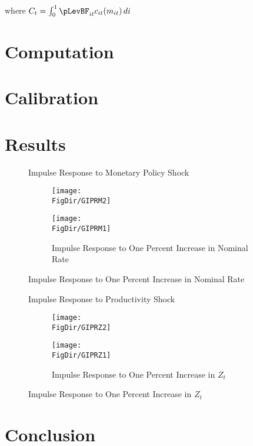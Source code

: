 \documentclass[titlepage]{\econtex}\providecommand{\texname}{BufferStockTheory}
\providecommand{\FigDir}{Figures}
\providecommand{\TableDir}{Tables}
\begin{document}
 where $C_{t} =  \int_{0}^{1} \pLevBF_{it} c_{it}(m_{it})\, di $


\hypertarget{Computation}{}
\section{Computation}

\hypertarget{Calibration}{}
\section{Calibration}








\hypertarget{Results}{}
\section{Results}

\begin{figure}{Impulse Response to Monetary Policy Shock}
  \begin{subfigure}{}
    \centering\texttt{[image: \\FigDir/GIPRM2]}
  \end{subfigure}
  \begin{subfigure}{}
    \centering\texttt{[image: \\FigDir/GIPRM1]}
    \caption{ Impulse Response to One Percent Increase in Nominal Rate}
  \end{subfigure}
\end{figure}

\begin{figure}{Impulse Response to Productivity Shock}
  \begin{subfigure}{}
    \centering\texttt{[image: \\FigDir/GIPRZ2]}
  \end{subfigure}
  \begin{subfigure}{}
    \centering\texttt{[image: \\FigDir/GIPRZ1]}
    \caption{ Impulse Response to One Percent Increase in $Z_{t}$}
  \end{subfigure}
\end{figure}



\hypertarget{Conclusion}{}
\section{Conclusion}
\end{document}
